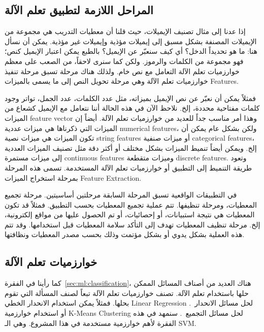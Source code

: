 \subsection{المراحل اللازمة لتطبيق تعلم الآلة}
\label{sec:ml:steps}
إذا عدنا إلى مثال تصنيف الإيميلات، حيث قلنا أن معطيات التدريب هي مجموعة من الإيميلات المصنفة بشكل مسبق إلى إيميلات مؤذية وإيميلات غير مؤذية.
يمكن أن نسأل هنا: ما هو تحديداً الدخل؟ أي كيف سنعبّر عن الإيميل؟ بالطبع يمكن اعتبار الإيميل كنص؛ فهو مجموعة من الكلمات والرموز.
ولكن كما سنرى لاحقاً، من الصعب على معظم خوارزميات تعلم الآلة التعامل مع نص خام. ولذلك هناك مرحلة تسبق مرحلة تنفيذ خوارزميات تعلم الآلة
وهي مرحلة تحويل النص إلى ما يسمى بالميزات \textenglish{Features}.

فمثلاً يمكن أن نعبّر عن نص الإيميل بميزاته، مثل عدد الكلمات، عدد الجمل،
تواتر وجود كلمات مفتاحية محددة، إلخ. نلاحظ الآن في هذه الحالة أننا نتعامل مع الإيميل كشعاع من الميزات \textenglish{feature vector} وهذا أمر مناسب جداً
للعديد من خوارزميات تعلم الآلة. أيضاً إن الميزات التي ذكرناها هي ميزات عددية \textenglish{numerical features}، ولكن بشكل عام يمكن أن تكون الميزات
هي ميزات نصية \textenglish{string features} أو ميزات صنفية \textenglish{categorical features}، إلخ. ويمكن أيضاً تنميط الميزات بشكل مختلف أو أكثر دقة
مثل تصنيف الميزات العددية إلى ميزات مستمرة \textenglish{continuous features} وميزات متقطعة \textenglish{discrete features}. وتعود طريقة التنميط إلى
التطبيق أو خوارزميات تعلم الآلة المستخدمة. تسمى هذه المرحلة بمرحلة استخراج الميزات \textenglish{Feature Extraction}.

في التطبيقات الواقعية تسبق المرحلة السابقة مرحلتين أساسيتين. مرحلة تجميع المعطيات، ومرحلة تنظيفها. تتم عملية تجميع المعطيات بحسب التطبيق.
فمثلاً قد تكون المعطيات هي نتيجة استبيانات، أو إحصائيات، أو تم الحصول عليها من مواقع إلكترونية، إلخ.
مرحلة تنظيف المعطيات تهدف إلى التأكد سلامة المعطيات قبل استخدامها. وقد تتم هذه العملية بشكل يدوي أو بشكل مؤتمت وذلك بحسب مصدر المعطيات ونظافتها.




\subsection{خوارزميات تعلم الآلة}
كما رأينا في الفقرة~\ref{sec:ml:classification}، هناك العديد من أصناف المسائل الممكن حلها باستخدام تعلم الآلة.
تصنف خوارزميات تعلم الآلة تبعاً لصنف المسألة التي تقوم بحلها. فمثلاً يمكن استخدام الانحدار الخطي
\textenglish{Linear Regression}
لحل مسائل الانحدار~\cite{hands-on}.
أو استخدام خوارزمية \textenglish{K-Means Clustering}  لحل مسائل التجميع~\cite{hands-on}.
سنمهد في هذه الفقرة لأهم خوارزمية مستخدمة في هذا المشروع.
وهي الـ \textenglish{SVM}.


